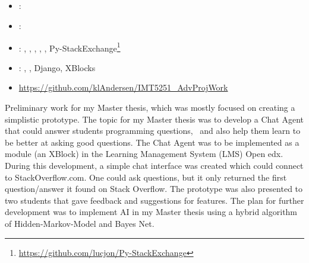 \subsection[Advanced Project Work]{}
\label{sec:adv_proj_work}
\begin{itemize} 
	\item {}: 
	\item {}: 
	\item {}: , , , , , 
	Py-StackExchange\footnote{\url{https://github.com/lucjon/Py-StackExchange}}
	\item {}: , , Django, XBlocks
	\item {} \url{https://github.com/klAndersen/IMT5251_AdvProjWork}
\end{itemize} 
Preliminary work for my Master thesis, which was mostly focused on creating a simplistic prototype. 
The topic for my Master thesis was to develop a Chat Agent that could answer students programming questions,  and also help them learn to be better at asking good questions. 
The Chat Agent was to be implemented as a module (an XBlock) in the Learning Management System (LMS) Open edx. 
\vspace{0.5em}\newline
During this development, a simple chat interface was created which could connect to StackOverflow.com. 
One could ask questions, but it only returned the first question/answer it found on Stack Overflow. 
The prototype was also presented to two students that gave feedback and suggestions for features. 
The plan for further development was to implement AI in my Master thesis using a hybrid algorithm of Hidden-Markov-Model and Bayes Net. 

